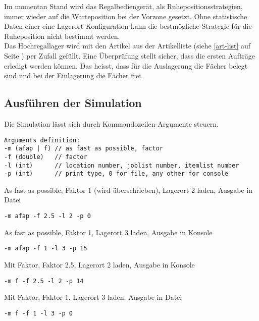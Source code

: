 %
Im momentan Stand wird das Regalbediengerät, als Ruhepositionsstrategien, immer wieder auf die Warteposition bei der Vorzone gesetzt. Ohne statistische Daten einer eine Lagerort-Konfiguration kann die bestmögliche Strategie für die Ruheposition nicht bestimmt werden.\\
%
Das Hochregallager wird mit den Artikel aus der Artikelliste (siehe \ref{art-list} auf Seite \pageref{art-list}) per Zufall gefüllt. Eine Überprüfung stellt sicher, dass die ersten Aufträge erledigt werden können. Das heisst, dass für die Auslagerung die Fächer belegt sind und bei der Einlagerung die Fächer frei.
%
\subsection{Ausführen der Simulation}
Die Simulation lässt sich durch Kommandozeilen-Argumente steuern. 

\begin{verbatim}
Arguments definition:
-m (afap | f) // as fast as possible, factor
-f (double)   // factor 
-l (int)      // location number, joblist number, itemlist number
-p (int)      // print type, 0 for file, any other for console 
\end{verbatim}

As fast as possible, Faktor 1 (wird überschrieben), Lagerort 2 laden, Ausgabe in Datei
\begin{verbatim}
-m afap -f 2.5 -l 2 -p 0
\end{verbatim}
As fast as possible, Faktor 1, Lagerort 3 laden, Ausgabe in Konsole
\begin{verbatim}
-m afap -f 1 -l 3 -p 15
\end{verbatim}
Mit Faktor, Faktor 2.5, Lagerort 2 laden, Ausgabe in Konsole
\begin{verbatim}
-m f -f 2.5 -l 2 -p 14
\end{verbatim}
Mit Faktor, Faktor 1, Lagerort 3 laden, Ausgabe in Datei
\begin{verbatim}
-m f -f 1 -l 3 -p 0			  
\end{verbatim}
%
